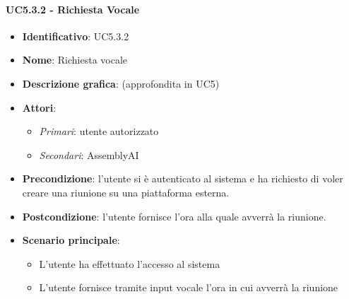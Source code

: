 \paragraph{UC5.3.2 - Richiesta Vocale}
\begin{itemize}
   \item \textbf{Identificativo}: UC5.3.2
   \item \textbf{Nome}: Richiesta vocale
   \item \textbf{Descrizione grafica}: (approfondita in UC5)
   \item \textbf{Attori}:
   \begin{itemize} 
       \item \textit{Primari}: utente autorizzato
       \item \textit{Secondari}: AssemblyAI
   \end{itemize}
       \item \textbf{Precondizione}: l'utente si è autenticato al sistema e ha richiesto di voler creare una riunione su una piattaforma esterna.
       \item \textbf{Postcondizione}: l'utente fornisce l'ora alla quale avverrà la riunione.
    \item \textbf{Scenario principale}: 
       \begin{itemize}
           \item L'utente ha effettuato l'accesso al sistema 
           \item L'utente fornisce tramite input vocale l'ora in cui avverrà la riunione
       \end{itemize}
\end{itemize}


